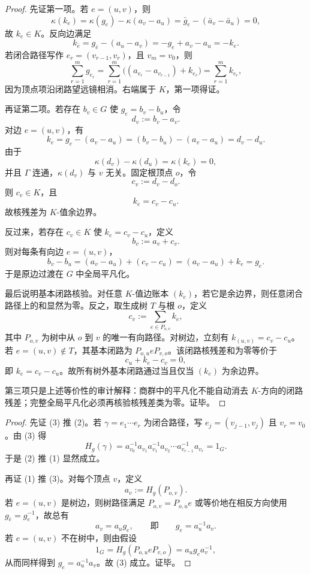 \begin{proof}
先证第一项。若 \(e=(u,v)\)，则
\[
\kappa(k_e)=\kappa(g_e)-\kappa(a_v-a_u)=\bar g_e-(\bar a_v-
\bar a_u)=0,
\]
故 \(k_e\in K\)。反向边满足
\[
k_{\bar e}=g_{\bar e}-(a_u-a_v)=-g_e+a_v-a_u=-k_e.
\]
若闭合路径写作 \(e_r=(v_{r-1},v_r)\)，且 \(v_m=v_0\)，则
\[
\sum_{r=1}^m g_{e_r}
=\sum_{r=1}^m \bigl((a_{v_r}-a_{v_{r-1}})+k_{e_r}\bigr)
=\sum_{r=1}^m k_{e_r},
\]
因为顶点项沿闭路望远镜相消。右端属于 \(K\)，第一项得证。

再证第二项。若存在 \(b_v\in G\) 使 \(g_e=b_v-b_u\)，令
\[
d_v:=b_v-a_v.
\]
对边 \(e=(u,v)\)，有
\[
k_e=g_e-(a_v-a_u)=(b_v-b_u)-(a_v-a_u)=d_v-d_u.
\]
由于
\[
\kappa(d_v)-\kappa(d_u)=\kappa(k_e)=0,
\]
并且 \(\Gamma\) 连通，\(\kappa(d_v)\) 与 \(v\) 无关。固定根顶点 \(o\)，令
\[
c_v:=d_v-d_o.
\]
则 \(c_v\in K\)，且
\[
k_e=c_v-c_u.
\]
故核残差为 \(K\)-值余边界。

反过来，若存在 \(c_v\in K\) 使 \(k_e=c_v-c_u\)，定义
\[
b_v:=a_v+c_v.
\]
则对每条有向边 \(e=(u,v)\)，
\[
b_v-b_u=(a_v-a_u)+(c_v-c_u)=(a_v-a_u)+k_e=g_e.
\]
于是原边过渡在 \(G\) 中全局平凡化。

最后说明基本闭路核验。对任意 \(K\)-值边账本 \((k_e)\)，若它是余边界，则任意闭合路径上的和显然为零。反之，取生成树 \(T\) 与根 \(o\)，定义
\[
c_v:=\sum_{e\in P_{o,v}} k_e,
\]
其中 \(P_{o,v}\) 为树中从 \(o\) 到 \(v\) 的唯一有向路径。对树边，立刻有 \(k_{(u,v)}=c_v-c_u\)。若 \(e=(u,v)\notin T\)，其基本闭路为 \(P_{o,u}eP_{v,o}\)。该闭路核残差和为零等价于
\[
c_u+k_e-c_v=0,
\]
即 \(k_e=c_v-c_u\)。故所有树外基本闭路通过当且仅当 \((k_e)\) 为余边界。

第三项只是上述等价性的审计解释：商群中的平凡化不能自动消去 \(K\)-方向的闭路残差；完整全局平凡化必须再核验核残差类为零。证毕。
\end{proof}

\begin{proof}
先证 (3) 推 (2)。若 \(\gamma=e_1\cdots e_r\) 为闭合路径，写 \(e_j=(v_{j-1},v_j)\) 且 \(v_r=v_0\)。由 (3) 得
\[
H_g(\gamma)=a_{v_0}^{-1}a_{v_1}a_{v_1}^{-1}a_{v_2}\cdots a_{v_{r-1}}^{-1}a_{v_r}=1_G.
\]
于是 (2) 推 (1) 显然成立。

再证 (1) 推 (3)。对每个顶点 \(v\)，定义
\[
a_v:=H_g(P_{o,v}).
\]
若 \(e=(u,v)\) 是树边，则树路径满足 \(P_{o,v}=P_{o,u}e\) 或等价地在相反方向使用 \(g_{\bar e}=g_e^{-1}\)，故总有
\[
a_v=a_u g_e,\qquad\text{即}\qquad g_e=a_u^{-1}a_v.
\]
若 \(e=(u,v)\) 不在树中，则由假设
\[
1_G=H_g(P_{o,u}eP_{v,o})=a_u g_e a_v^{-1},
\]
从而同样得到 \(g_e=a_u^{-1}a_v\)。故 (3) 成立。证毕。
\end{proof}

